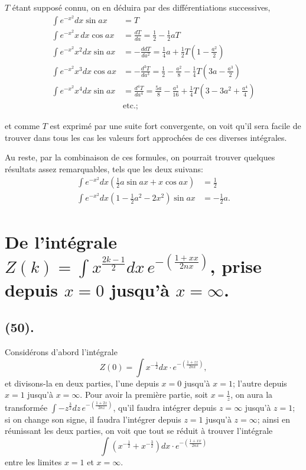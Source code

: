 \documentclass{article}
\begin{document}
$T$ étant supposé connu, on en déduira par des différentiations successives,
\[ \begin{aligned} \int e^{-x^{2}}dx\sin ax&=T\\ \int e^{-x^{2}}x\,dx\cos ax&=\frac{dT}{da}=\frac{1}{2}-\frac{1}{2}aT\\ \int e^{-x^{2}}x^{2}dx\sin ax&=-\frac{ddT}{da^{2}}=\frac{1}{4}a+\frac{1}{2}T\left(1-\frac{a^{2}}{2}\right)\\ \int e^{-x^{2}}x^{3}dx\cos ax&=-\frac{d^{3}T}{da^{3}}=\frac{1}{2}-\frac{a^{2}}{8}-\frac{1}{4}T\left(3a-\frac{a^{3}}{2}\right)\\ \int e^{-x^{2}}x^{4}dx\sin ax&=\frac{d^{4}T}{da^{4}}=\frac{5a}{8}-\frac{a^{3}}{16}+\frac{1}{4}T\left(3-3a^{2}+\frac{a^{4}}{4}\right)\\ &\text{etc.}; \end{aligned} \]

et comme $T$ est exprimé par une suite fort convergente, on voit qu'il sera facile de trouver dans tous les cas les valeurs fort approchées de ces diverses intégrales.

Au reste, par la combinaison de ces formules, on pourrait trouver quelques résultats assez remarquables, tels que les deux suivans:
\[ \begin{aligned} \int e^{-x^{2}}dx\left(\tfrac{1}{2}a\sin ax+x\cos ax\right)&=\tfrac{1}{2}\\ \int e^{-x^{2}}dx\left(1-\tfrac{1}{2}a^{2}-2x^{2}\right)\sin ax&=-\tfrac{1}{2}a. \end{aligned} \]

\section*{De l'intégrale $\displaystyle Z(k)=\int x^{\frac{2k-1}{2}}dx\,e^{-\left(\frac{1+xx}{2nx}\right)}$, prise depuis $x=0$ jusqu'à $x=\infty$.}

\subsection*{(50).}

Considérons d'abord l'intégrale
\[ Z(0)=\int x^{-\frac{1}{2}}dx\cdot e^{-\left(\frac{1+zz}{2nx}\right)}, \]
 et divisons-la en deux parties, l'une depuis $x=0$ jusqu'à $x=1$; l'autre depuis $x=1$ jusqu'à $x=\infty$. Pour avoir la première partie, soit $x=\frac{1}{z}$, on aura la transformée $\displaystyle\int-z^{\frac{3}{2}}dz\,e^{-\left(\frac{1+2z}{2nz}\right)}$, qu'il faudra intégrer depuis $z=\infty$ jusqu'à $z=1$; si on change son signe, il faudra l'intégrer depuis $z=1$ jusqu'à $z=\infty$; ainsi en réunissant les deux parties, on voit que tout se réduit à trouver l'intégrale
\[ \int\left(x^{-\frac{1}{2}}+x^{-\frac{3}{2}}\right)dx\cdot e^{-\left(\frac{1+xx}{2nx}\right)} \]
entre les limites $x=1$ et $x=\infty$.
\end{document}
